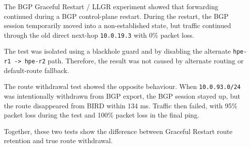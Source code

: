 The BGP Graceful Restart / LLGR experiment showed that forwarding continued during a BGP control-plane restart. During the restart, the BGP session temporarily moved into a non-established state, but traffic continued through the old direct next-hop \texttt{10.0.19.3} with 0\% packet loss.

The test was isolated using a blackhole guard and by disabling the alternate \texttt{hpe-r1 -> hpe-r2} path. Therefore, the result was not caused by alternate routing or default-route fallback.

The route withdrawal test showed the opposite behaviour. When \texttt{10.0.93.0/24} was intentionally withdrawn from BGP export, the BGP session stayed up, but the route disappeared from BIRD within 134 ms. Traffic then failed, with 95\% packet loss during the test and 100\% packet loss in the final ping.

Together, these two tests show the difference between Graceful Restart route retention and true route withdrawal.
